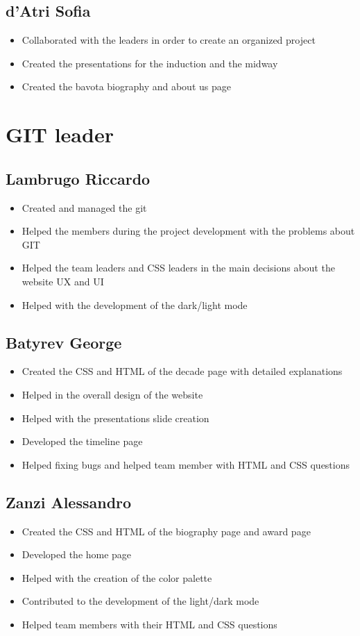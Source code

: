 \documentclass[11pt]{article}
\begin{document}
\subsection*{d'Atri Sofia}
\begin{itemize}
\item Collaborated with the leaders in order to create an organized project
\item Created the presentations for the induction and the midway
\item Created the bavota biography and about us page
\end{itemize}

\section*{GIT leader}
\subsection*{Lambrugo Riccardo}
\begin{itemize}
 \item Created and managed the git
 \item Helped the members during the project development with the problems about GIT
 \item Helped the team leaders and CSS leaders in the main decisions about the website UX and UI
 \item Helped with the development of the dark/light mode
\end{itemize}

\subsection*{Batyrev George}
\begin{itemize}
 \item Created the CSS and HTML of the decade page with detailed explanations
 \item Helped in the overall design of the website
 \item Helped with the presentations slide creation
 \item Developed the timeline page
 \item Helped fixing bugs and helped team member with HTML and CSS questions
\end{itemize}
\subsection*{Zanzi Alessandro}
\begin{itemize}
 \item Created the CSS and HTML of the biography page and award page
 \item Developed the home page
 \item Helped with the creation of the color palette
 \item Contributed to the development of the light/dark mode
 \item Helped team members with their HTML and CSS questions
\end{itemize}
\end{document}
